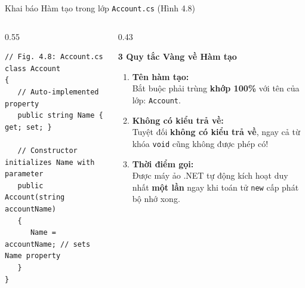 \documentclass[aspectratio=169, 10pt]{beamer}
\begin{document}
\begin{frame}[fragile]{Khai báo Hàm tạo trong lớp \texttt{Account.cs} (Hình 4.8)}
  \begin{columns}[T]
    \begin{column}{0.55\textwidth}
      \begin{tcolorbox}[colback=CodeBg,colframe=UniNavy,title=\textbf{Account.cs with Constructor (Fig. 4.8)},fonttitle=\small\bfseries]
\begin{lstlisting}
// Fig. 4.8: Account.cs
class Account
{
   // Auto-implemented property
   public string Name { get; set; }

   // Constructor initializes Name with parameter
   public Account(string accountName)
   {
      Name = accountName; // sets Name property
   }
}
\end{lstlisting}
      \end{tcolorbox}
    \end{column}

    \begin{column}{0.43\textwidth}
      \begin{block}{\textbf{3 Quy tắc Vàng về Hàm tạo}}
        \begin{enumerate}\small
          \item \textbf{Tên hàm tạo:}\\
          Bắt buộc phải trùng \textbf{khớp 100\%} với tên của lớp: \texttt{Account}.
          \item \textbf{Không có kiểu trả về:}\\
          Tuyệt đối \textbf{không có kiểu trả về}, ngay cả từ khóa \texttt{void} cũng không được phép có!
          \item \textbf{Thời điểm gọi:}\\
          Được máy ảo .NET tự động kích hoạt duy nhất \textbf{một lần} ngay khi toán tử \texttt{new} cấp phát bộ nhớ xong.
        \end{enumerate}
      \end{block}
    \end{column}
  \end{columns}
\end{frame}
\end{document}

